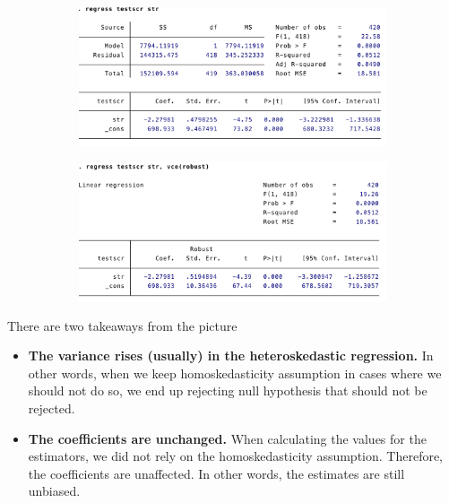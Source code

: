 \documentclass[12pt]{article}
\theoremstyle{definition}
\theoremstyle{property}
\theoremstyle{assumption}
\theoremstyle{example}
\theoremstyle{comment}
\begin{document}
\begin{figure}[H]
\centering
\begin{subfigure}[H]{0.475\textwidth}
\includegraphics[width=\textwidth]{nonrobust.png}
\end{subfigure}
\begin{subfigure}[H]{0.475\textwidth}
\includegraphics[width=\textwidth]{robust.png}
\end{subfigure}
\end{figure}
There are two takeaways from the picture
\begin{itemize}
\item \textbf{The variance rises (usually) in the heteroskedastic regression.} In other words, when we keep homoskedasticity assumption in cases where we should not do so, we end up rejecting null hypothesis that should not be rejected.
\item \textbf{The coefficients are unchanged.} When calculating the values for the estimators, we did not rely on the homoskedasticity assumption. Therefore, the coefficients are unaffected. In other words, the estimates are still unbiased.
\end{itemize}
\end{document}
